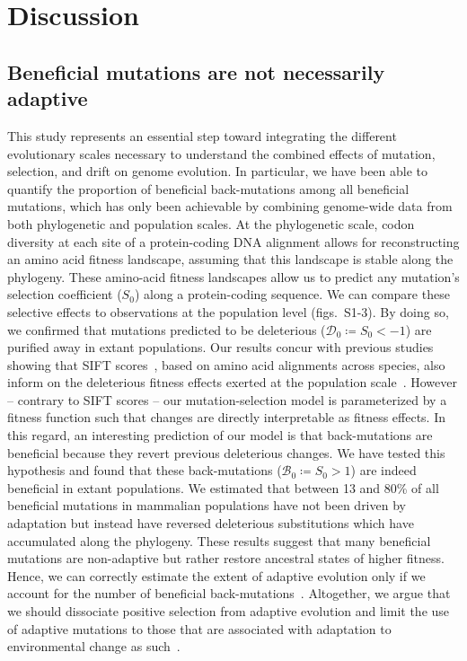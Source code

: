 \documentclass[12pt]{article}
\newcommand{\Sphy}{S_{0}}
\newcommand{\SphyDel}{\mathcal{D}_0}
\newcommand{\SphyBen}{\mathcal{B}_0}
\begin{document}
\section*{Discussion}
\subsection*{Beneficial mutations are not necessarily adaptive}

This study represents an essential step toward integrating the different evolutionary scales necessary to understand the combined effects of mutation, selection, and drift on genome evolution.
In particular, we have been able to quantify the proportion of beneficial back-mutations among all beneficial mutations, which has only been achievable by combining genome-wide data from both phylogenetic and population scales.
At the phylogenetic scale, codon diversity at each site of a protein-coding DNA alignment allows for reconstructing an amino acid fitness landscape, assuming that this landscape is stable along the phylogeny.
These amino-acid fitness landscapes allow us to predict any mutation’s selection coefficient ($\Sphy$) along a protein-coding sequence.
We can compare these selective effects to observations at the population level (figs.~S1-3).
By doing so, we confirmed that mutations predicted to be deleterious ($\SphyDel \coloneqq \Sphy < -1$) are purified away in extant populations.
Our results concur with previous studies showing that SIFT scores~\cite{ng_sift_2003, vaser_sift_2016}, based on amino acid alignments across species, also inform on the deleterious fitness effects exerted at the population scale~\cite{chen_hunting_2021}.
However – contrary to SIFT scores – our mutation-selection model is parameterized by a fitness function such that changes are directly interpretable as fitness effects.
In this regard, an interesting prediction of our model is that back-mutations are beneficial because they revert previous deleterious changes.
We have tested this hypothesis and found that these back-mutations ($\SphyBen \coloneqq \Sphy > 1 $) are indeed beneficial in extant populations.
We estimated that between 13 and 80\% of all beneficial mutations in mammalian populations have not been driven by adaptation but instead have reversed deleterious substitutions which have accumulated along the phylogeny.
These results suggest that many beneficial mutations are non-adaptive but rather restore ancestral states of higher fitness.
Hence, we can correctly estimate the extent of adaptive evolution only if we account for the number of beneficial back-mutations~\cite{keightley_what_2010, rice_evolutionarily_2015}.
Altogether, we argue that we should dissociate positive selection from adaptive evolution and limit the use of adaptive mutations to those that are associated with adaptation to environmental change as such~\cite{charlesworth_other_2007, mustonen_fitness_2009}.
\end{document}

